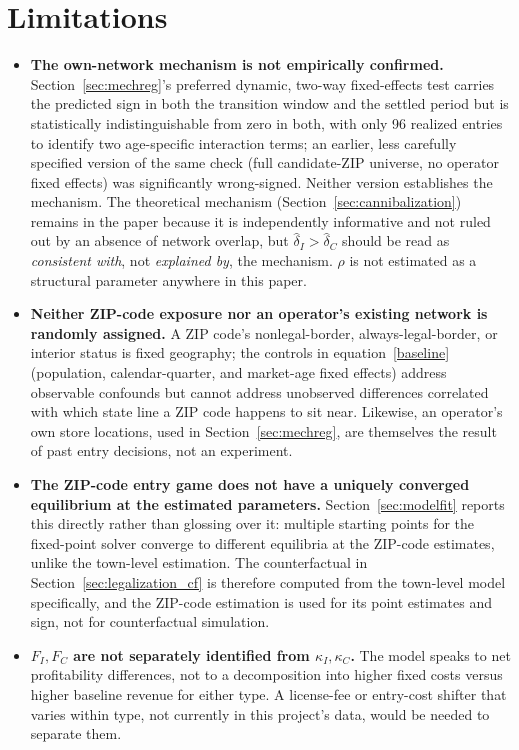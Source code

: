 \documentclass[english,12pt]{article}
\begin{document}
\section{Limitations}
\label{sec:limitations}

\begin{itemize}
\item \textbf{The own-network mechanism is not empirically confirmed.} Section~\ref{sec:mechreg}'s preferred dynamic, two-way fixed-effects test carries the predicted sign in both the transition window and the settled period but is statistically indistinguishable from zero in both, with only 96 realized entries to identify two age-specific interaction terms; an earlier, less carefully specified version of the same check (full candidate-ZIP universe, no operator fixed effects) was significantly wrong-signed. Neither version establishes the mechanism. The theoretical mechanism (Section~\ref{sec:cannibalization}) remains in the paper because it is independently informative and not ruled out by an absence of network overlap, but $\hat\delta_I>\hat\delta_C$ should be read as \emph{consistent with}, not \emph{explained by}, the mechanism. $\rho$ is not estimated as a structural parameter anywhere in this paper.
\item \textbf{Neither ZIP-code exposure nor an operator's existing network is randomly assigned.} A ZIP code's nonlegal-border, always-legal-border, or interior status is fixed geography; the controls in equation~\eqref{baseline} (population, calendar-quarter, and market-age fixed effects) address observable confounds but cannot address unobserved differences correlated with which state line a ZIP code happens to sit near. Likewise, an operator's own store locations, used in Section~\ref{sec:mechreg}, are themselves the result of past entry decisions, not an experiment.
\item \textbf{The ZIP-code entry game does not have a uniquely converged equilibrium at the estimated parameters.} Section~\ref{sec:modelfit} reports this directly rather than glossing over it: multiple starting points for the fixed-point solver converge to different equilibria at the ZIP-code estimates, unlike the town-level estimation. The counterfactual in Section~\ref{sec:legalization_cf} is therefore computed from the town-level model specifically, and the ZIP-code estimation is used for its point estimates and sign, not for counterfactual simulation.
\item \textbf{$F_I, F_C$ are not separately identified from $\kappa_I,\kappa_C$.} The model speaks to net profitability differences, not to a decomposition into higher fixed costs versus higher baseline revenue for either type. A license-fee or entry-cost shifter that varies within type, not currently in this project's data, would be needed to separate them.

\end{itemize}
\end{document}
